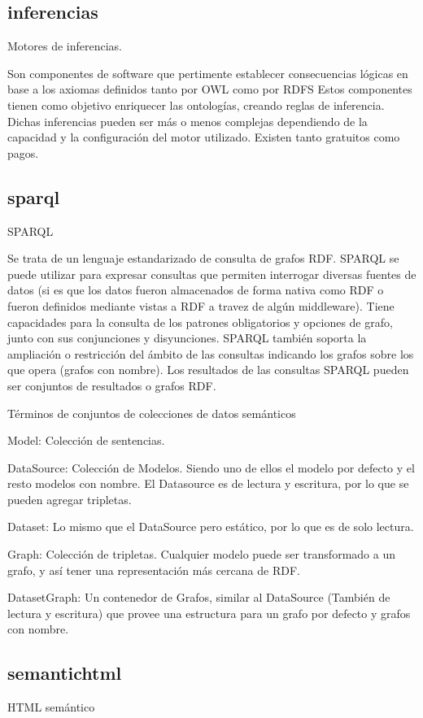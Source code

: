 \subsection{inferencias}

Motores de inferencias.

Son componentes de software que pertimente establecer consecuencias lógicas en base a los axiomas definidos tanto por OWL como por RDFS
Estos componentes tienen como objetivo enriquecer las ontologías, creando reglas de inferencia. 
Dichas inferencias pueden ser más o menos complejas dependiendo de la capacidad y la configuración del motor utilizado. Existen tanto gratuitos 
como pagos.


\subsection{sparql}
SPARQL

Se trata de un lenguaje estandarizado de consulta de grafos RDF.
SPARQL se puede utilizar para expresar consultas que permiten interrogar diversas fuentes de datos (si es que los datos fueron almacenados 
de forma nativa como RDF o fueron definidos mediante vistas a RDF a travez de algún middleware). Tiene capacidades para la consulta
de los patrones obligatorios y opciones de grafo, junto con sus conjunciones y disyunciones. SPARQL también soporta 
la ampliación o restricción del ámbito de las consultas indicando los grafos sobre los que opera (grafos con nombre). Los resultados de las consultas
SPARQL pueden ser conjuntos de resultados o grafos RDF.


Términos de conjuntos de colecciones de datos semánticos

Model: Colección de sentencias.

DataSource: Colección de Modelos. Siendo uno de ellos el modelo por defecto y el resto modelos con nombre. El Datasource es de lectura y escritura, por lo que se pueden agregar tripletas.

Dataset: Lo mismo que el DataSource pero estático, por lo que es de solo lectura.

Graph: Colección de tripletas. Cualquier modelo puede ser transformado a un grafo, y así tener una representación más cercana de RDF.

DatasetGraph: Un contenedor de Grafos, similar al DataSource (También de lectura y escritura) que provee una estructura para un grafo por defecto y grafos con nombre.

\subsection{semantichtml}
HTML semántico

